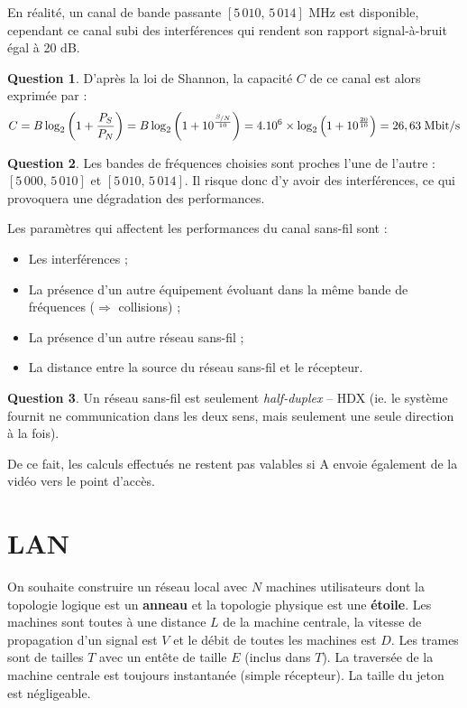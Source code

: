 \documentclass[11pt,english,french]{scrreprt}
\theoremstyle{remark}
\theoremstyle{definition}
\newtheorem{ques}{Question}[section]
\begin{document}
En réalité, un canal de bande passante $[5\,010,\,5\,014]$ MHz est disponible, cependant ce canal subi des interférences qui rendent son rapport signal-à-bruit égal à 20 dB.

\begin{ques}
	D'après la loi de Shannon, la capacité $C$ de ce canal est alors exprimée par :\[C=B\log_2\left(1+\frac{P_S}{P_N}\right)=B\log_2\left(1+10^{\frac{\nicefrac{S}{N}}{10}}\right)= 4.10^6\times \log_2\left(1+10^{\frac{20}{10}}\right)=26,63\;\textrm{Mbit/s}\]
\end{ques}

\begin{ques}
	Les bandes de fréquences choisies sont proches l'une de l'autre : $[5\,000,\,5\,010]$ et $[5\,010,\,5\,014]$. Il risque donc d'y avoir des interférences, ce qui provoquera une dégradation des performances.
	
	Les paramètres qui affectent les performances du canal sans-fil sont :\begin{itemize}
		\item Les interférences ;
		\item La présence d'un autre équipement évoluant dans la même bande de fréquences ($\Rightarrow$ collisions) ;
		\item La présence d'un autre réseau sans-fil ;
		\item La distance entre la source du réseau sans-fil et le récepteur.
	\end{itemize}
\end{ques}

\begin{ques}
	Un réseau sans-fil est seulement \emph{half-duplex} -- HDX (ie. le système fournit ne communication dans les deux sens, mais seulement une seule direction à la fois).
	
	De ce fait, les calculs effectués ne restent pas valables si A envoie également de la vidéo vers le point d'accès.
\end{ques}

\section{LAN} %

On souhaite construire un réseau local avec $N$ machines utilisateurs dont la topologie logique est un \textbf{anneau} et la topologie physique est une \textbf{étoile}. Les machines sont toutes à une distance $L$ de la machine centrale, la vitesse de propagation d'un signal est $V$ et le débit de toutes les machines est $D$. Les trames sont de tailles $T$ avec un entête de taille $E$ (inclus dans $T$). La traversée de la machine centrale est toujours instantanée (simple récepteur). La taille du jeton est négligeable.
\end{document}
